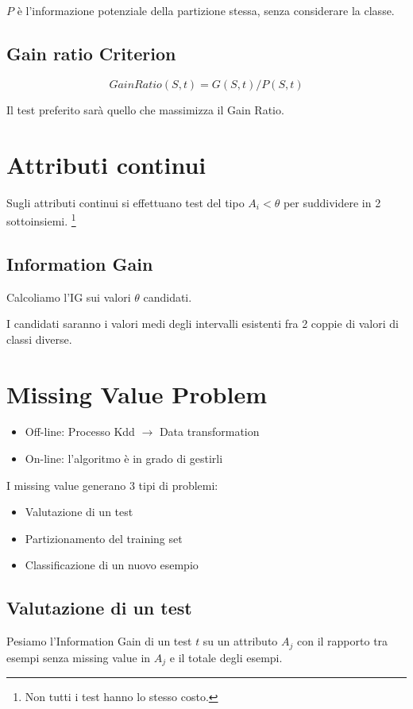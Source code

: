 \documentclass[11pt,onecolumn,a4paper,oneside]{book}
\begin{document}
	$P$ è l'informazione potenziale della partizione stessa, senza considerare la classe.


\subsection{Gain ratio Criterion}
$$ GainRatio(S,t) = G(S,t) / P(S,t) $$

Il test preferito sarà quello che massimizza il Gain Ratio.

\section{Attributi continui}
Sugli attributi continui si effettuano test del tipo $A_i < \theta$ per suddividere in 2 sottoinsiemi.
\footnote{Non tutti i test hanno lo stesso costo.}

\subsection{Information Gain}
Calcoliamo l'IG sui valori $\theta$ candidati.

I candidati saranno i valori medi degli intervalli esistenti fra 2 coppie di valori di classi diverse. 

\section{Missing Value Problem}
\begin{itemize}
\item Off-line: Processo Kdd $\rightarrow$ Data transformation
\item On-line: l'algoritmo è in grado di gestirli
\end{itemize}

I missing value generano 3 tipi di problemi:
\begin{itemize}
\item Valutazione di un test
\item Partizionamento del training set
\item Classificazione di un nuovo esempio
\end{itemize}

\subsection{Valutazione di un test}
Pesiamo l'Information Gain di un test $t$ su un attributo $A_j$ con il rapporto tra esempi senza missing value in $A_j$ e il totale degli esempi.
\end{document}
